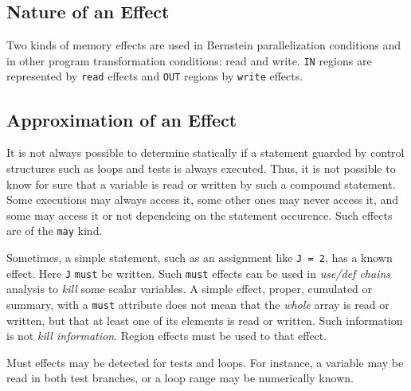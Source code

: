 \documentclass[a4paper]{article}
\begin{document}
\subsection{Nature of an Effect}
\label{subsection-action}

{}

Two kinds of memory effects are used in Bernstein parallelization
conditions \cite{Bern66} and in other program transformation conditions:
read and write. \verb/IN/ regions are represented by \verb/read/ effects
and \verb/OUT/ regions by \verb/write/ effects.


\subsection{Approximation of an Effect}
\label{subsection-approximation}

{}

It is not always possible to determine statically if a statement guarded
by control structures such as loops and tests is always executed. Thus,
it is not possible to know for sure that a variable is read or written
by such a compound statement. Some executions may always access it, some
other ones may never access it, and some may access it or not dependeing
on the statement occurence. Such effects are of the \verb/may/ kind.

\begin{comment}
La pr�sence de tests et boucles ne permet pas de d�terminer en g�n�ral
si une variable est effectivement lue ou �crite lors de l'ex�cution
d'un \texttt{statement}. Il se peut m�me que certaines ex�cutions
y acc�dent et que d'autres n'y fassent pas r�f�rence. Les effets
calcul�s sont alors de type \texttt{may}.
\end{comment}

Sometimes, a simple statement, such as an assignment like \texttt{J = 2},
has a known effect. Here \texttt{J} \verb/must/ be written. Such
\verb/must/ effects can be used in \emph{use/def chains} analysis to 
\emph{kill} some scalar variables. A simple effect, proper, cumulated or
summary, with a \verb/must/ attribute does not mean that the \emph{whole}
array is read or written, but that at least one of its elements is read
or written. Such information is not \emph{kill information}. Region
effects must be used to that effect.

Must effects may be detected for tests and loops. For instance, a
variable may be read in both test branches, or a loop range may be
numerically known.
\end{document}
